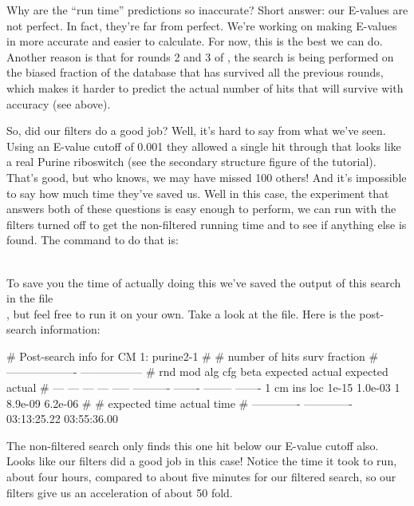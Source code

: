 \begin{srefaq}{Why are the  ``run time'' predictions 
  so inaccurate?} Short answer: our E-values are not perfect. In fact,
  they're far from perfect. We're working on making E-values in
   more accurate and easier to calculate. For now,
  this is the best we can do. Another reason is that for rounds 2 and
  3 of , the search is being performed on the biased
  fraction of the database that has survived all the previous rounds,
  which makes it harder to predict the actual number of hits that will
  survive with accuracy (see above).
\end{srefaq}

So, did our filters do a good job? Well, it's hard to say from what
we've seen. Using an E-value cutoff of 0.001 they allowed a single hit
through that looks like a real Purine riboswitch (see the secondary
structure figure of the tutorial). That's good, but who knows, we may
have missed 100 others! And it's impossible to say how much time
they've saved us. Well in this case, the experiment that answers both
of these questions is easy enough to perform, we can run
 with the filters turned off 
to get the non-filtered running time and to see if anything else
is found. The command to do that is: 

\\

To save you the time of actually doing this we've saved the
output of this search in the file\\
 ,
but feel free to run it on your own. Take a look at the file. Here is
the post-search information:


{\samepage
\begin{sreoutput}
# Post-search info for CM 1: purine2-1
#
#                              number of hits       surv fraction  
#                            -------------------  -----------------
# rnd  mod  alg  cfg   beta    expected   actual  expected   actual
# ---  ---  ---  ---  -----  ----------  -------  --------  -------
    1   cm  ins  loc  1e-15     1.0e-03        1   8.9e-09  6.2e-06
#
# expected time    actual time
# -------------  -------------
    03:13:25.22    03:55:36.00
\end{sreoutput}
}

The non-filtered search only finds this one hit below our E-value
cutoff also. Looks like our filters did a good job in this case!
Notice the time it took to run, about four hours, compared to about five
minutes for our filtered search, so our filters give us an
acceleration of about 50 fold. 

